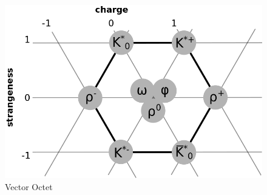 \documentclass[aps,prd,onecolumn,showpacs,amsmath,amssymb,nofootinbib]{revtex4} \pdfoutput=1
\begin{document}
\begin{figure}[!ht]
    \centering
    \includegraphics[scale=0.5]{vector-octet.png}
    \caption{Vector Octet}
    \label{fig:vector-octet}
\end{figure}
\end{document}
